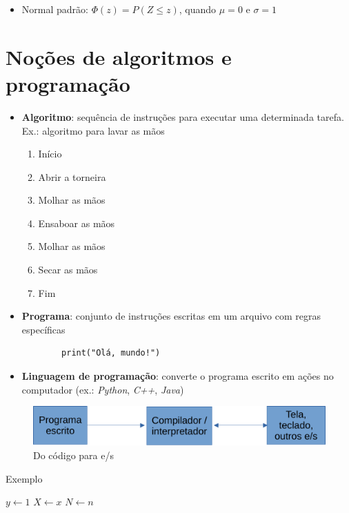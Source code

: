 \begin{itemize}
	\item Normal padrão: $\Phi(z)=P(Z\leq z)$, quando $\mu=0$ e $\sigma=1$
\end{itemize}


\section{Noções de algoritmos e programação}\label{sec:algoritmo}
\begin{itemize}
	\item \textbf{Algoritmo}: sequência de instruções para executar uma determinada tarefa. Ex.: algoritmo para lavar as mãos
	\begin{enumerate}
		\centering
		\item Início
		\item Abrir a torneira
		\item Molhar as mãos
		\item Ensaboar as mãos
		\item Molhar as mãos
		\item Secar as mãos
		\item Fim
	\end{enumerate}
	
	\item \textbf{Programa}: conjunto de instruções escritas em um arquivo com regras específicas
	\begin{verbatim}
		print("Olá, mundo!")
	\end{verbatim}
	\item \textbf{Linguagem de programação}: converte o programa escrito em ações no computador (ex.: \textit{Python}, \textit{C++}, \textit{Java})
\end{itemize}

\begin{figure}[h!]
	\centering
	\caption{Do código para e/s}
	\label{fig:codigoio}
	\includegraphics[width=0.7\linewidth]{figs/codigo_io}
\end{figure}

\begin{algorithm}
	\caption{Exemplo}\label{alg:ohm}
	$y \gets 1$\;
	$X \gets x$\;
	$N \gets n$\;
\end{algorithm}


